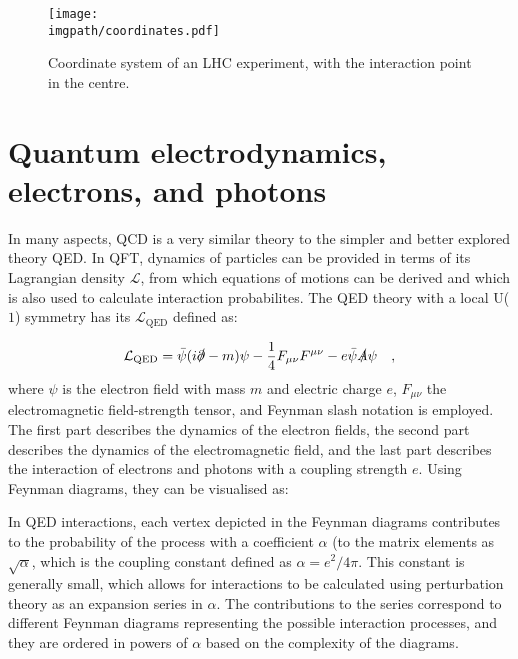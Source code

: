 \begin{figure}[H]
\texttt{[image: \\imgpath/coordinates.pdf]}
\caption{Coordinate system of an LHC experiment, with the interaction point in the centre.}
\label{fig:intro:coordinates}
\end{figure}

\section{Quantum electrodynamics, electrons, and photons}

In many aspects, QCD is a very similar theory to the simpler and better explored theory QED. In QFT, dynamics of particles can be provided in terms of its Lagrangian density $\mathcal{L}$, from which equations of motions can be derived and which is also used to calculate interaction probabilites. The QED theory with a local U($1$) symmetry has its $\mathcal{L}_\mathrm{QED}$ defined as:

\begin{equation}
\mathcal{L}_\mathrm{QED} = \bar{\psi}(i \slashed \partial - m)\psi - \frac{1}{4}F_{\mu\nu}F^{\mu\nu} - e\bar{\psi}\slashed A \psi \quad ,
\end{equation}
where $\psi$ is the electron field with mass $m$ and electric charge $e$, $F_{\mu\nu}$ the electromagnetic field-strength tensor, and Feynman slash notation is employed. The first part describes the dynamics of the electron fields, the second part describes the dynamics of the electromagnetic field, and the last part describes the interaction of electrons and photons with a coupling strength $e$. Using Feynman diagrams, they can be visualised as:
\begin{figure}[H]
\hspace{1em}
\hspace{1em}
\end{figure}

In QED interactions, each vertex depicted in the Feynman diagrams contributes to the probability of the process with a coefficient $\alpha$ (to the matrix elements as $\sqrt{\alpha}$, which is the coupling constant defined as $\alpha = e^2/4\pi$. This constant is generally small, which allows for interactions to be calculated using perturbation theory as an expansion series in $\alpha$. The contributions to the series correspond to different Feynman diagrams representing the possible interaction processes, and they are ordered in powers of $\alpha$ based on the complexity of the diagrams.

